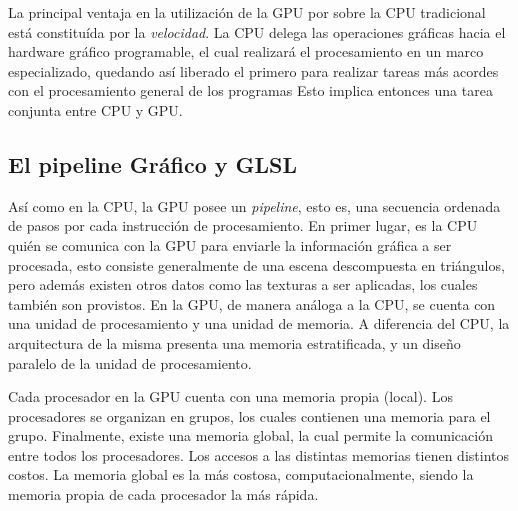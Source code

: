 La principal ventaja en la utilización de la GPU por sobre la CPU tradicional está constituída por la {\em velocidad}.
La CPU delega las operaciones gr\'aficas hacia el hardware gr\'afico programable, el cual realizar\'a el procesamiento en un marco especializado, quedando as\'i liberado el primero para realizar tareas m\'as acordes con el procesamiento general de los programas
Esto implica entonces una tarea conjunta entre CPU y GPU.


\subsection{El pipeline Gr\'afico y GLSL}
As\'i como en la CPU, la GPU posee un {\em pipeline}, esto es, una secuencia ordenada de pasos por cada instrucci\'on de procesamiento.
En primer lugar, es la CPU quién se comunica con la GPU para enviarle la información gráfica a ser procesada, esto consiste generalmente de una escena descompuesta en triángulos, pero además existen otros datos como las texturas a ser aplicadas, los cuales también son provistos.
En la GPU, de manera análoga a la CPU, se cuenta con una unidad de procesamiento y una unidad de memoria.
A diferencia del CPU, la arquitectura de la misma presenta una memoria estratificada, y un diseño paralelo de la unidad de procesamiento.

Cada procesador en la GPU cuenta con una memoria propia (local).
Los procesadores se organizan en grupos, los cuales contienen una memoria para el grupo.
Finalmente, existe una memoria global, la cual permite la comunicación entre todos los procesadores.
Los accesos a las distintas memorias tienen distintos costos.
La memoria global es la más costosa, computacionalmente, siendo la memoria propia de cada procesador la más rápida.

